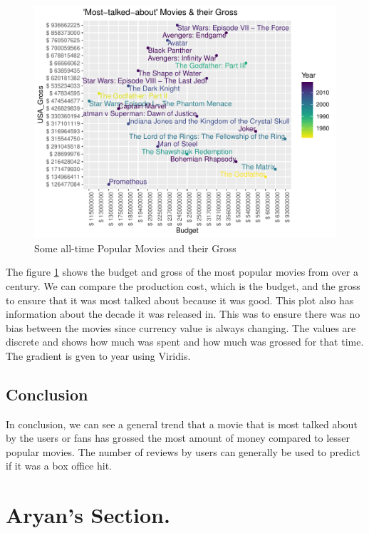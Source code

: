 \documentclass[11pt,a4paper,]{article}
\begin{document}
\begin{figure}[H]

{\centering \includegraphics{Report_files/figure-latex/AllGrossPlot-1} 

}

\caption{Some all-time Popular Movies and their Gross}\label{fig:AllGrossPlot}
\end{figure}

The figure \ref{fig:AllGrossPlot} shows the budget and gross of the most popular movies from over a century. We can compare the production cost, which is the budget, and the gross to ensure that it was most talked about because it was good. This plot also has information about the decade it was released in. This was to ensure there was no bias between the movies since currency value is always changing. The values are discrete and shows how much was spent and how much was grossed for that time. The gradient is gven to year using Viridis.

\hypertarget{conclusion}{%
\subsection{Conclusion}\label{conclusion}}

In conclusion, we can see a general trend that a movie that is most talked about by the users or fans has grossed the most amount of money compared to lesser popular movies. The number of reviews by users can generally be used to predict if it was a box office hit.

\newpage

\hypertarget{aryans-section.}{%
\section{Aryan's Section.}\label{aryans-section.}}
\end{document}
